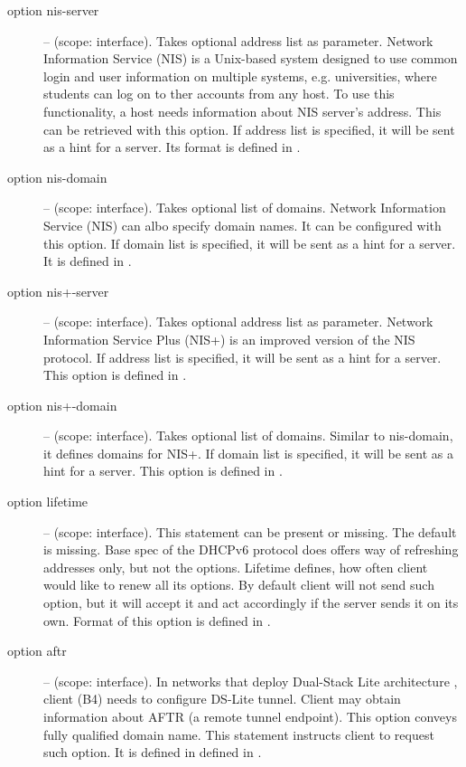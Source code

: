 \begin{description}
 \item[option nis-server] -- (scope: interface). Takes optional
   address list as parameter. Network Information Service (NIS) is a
   Unix-based system designed to use common login and user information
   on multiple systems, e.g. universities, where students can log on
   to ther accounts from any host. To use this functionality, a host
   needs information about NIS server's address. This can be retrieved
   with this option. If address list is specified, it will be sent as
   a hint for a server. Its format is defined in \cite{rfc3898}.

 \item[option nis-domain] -- (scope: interface). Takes optional list
   of domains. Network Information Service (NIS) can albo specify
   domain names. It can be configured with this option. If domain list
   is specified, it will be sent as a hint for a server. It is defined
   in \cite{rfc3898}.

 \item[option nis+-server] -- (scope: interface). Takes optional
   address list as parameter. Network Information Service Plus (NIS+)
   is an improved version of the NIS protocol. If address list is
   specified, it will be sent as a hint for a server. This option is
   defined in \cite{rfc3898}.

 \item[option nis+-domain] -- (scope: interface). Takes optional list
   of domains. Similar to nis-domain, it defines domains for NIS+. If
   domain list is specified, it will be sent as a hint for a
   server. This option is defined in \cite{rfc3898}.

 \item[option lifetime] -- (scope: interface). This statement can be
   present or missing. The default is missing.
   Base spec of the DHCPv6 protocol does offers way of refreshing
   addresses only, but not the options. Lifetime defines, how often
   client would like to renew all its options. By default client will
   not send such option, but it will accept it and act accordingly if
   the server sends it on its own. Format of this option is defined
   in \cite{rfc4242}.

 \item[option aftr] -- (scope: interface). In networks that deploy
   Dual-Stack Lite architecture \cite{rfc6333}, client (B4) needs to
   configure DS-Lite tunnel. Client may obtain information about AFTR
   (a remote tunnel endpoint). This option conveys fully qualified
   domain name. This statement instructs client to request such
   option. It is defined in defined in \cite{rfc6334}.


\end{description}
